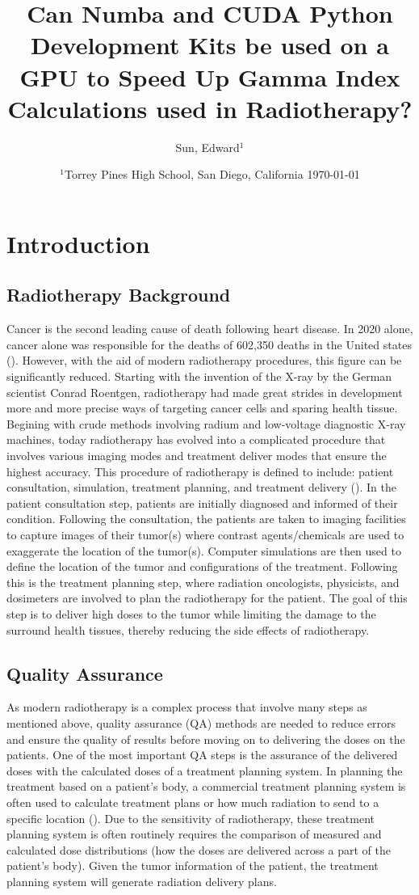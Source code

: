 \documentclass[12pt]{article}
\title{Can Numba and CUDA Python Development Kits be used on a GPU to Speed Up Gamma Index Calculations used in Radiotherapy?}
\author{
  Sun, Edward$^{1}$
}
\date{%
  $^{1}$Torrey Pines High School, San Diego, California
  \today
}
\begin{document}
\maketitle
\section{Introduction}
\subsection{Radiotherapy Background}
Cancer is the second leading cause of death following heart disease. In 2020 alone, cancer alone was responsible for the deaths of 602,350 deaths in the United states (\textcite{CDC}). However, with the aid of modern radiotherapy procedures, this figure can be significantly reduced. Starting with the invention of the X-ray by the German scientist Conrad Roentgen, radiotherapy had made great strides in development more and more precise ways of targeting cancer cells and sparing health tissue. Begining with crude methods involving radium and low-voltage diagnostic X-ray machines, today radiotherapy has evolved into a complicated procedure that involves various imaging modes and treatment deliver modes that ensure the highest accuracy. This procedure of radiotherapy is defined to include: patient consultation, simulation, treatment planning, and treatment delivery (\textcite{SBU}). In the patient consultation step, patients are initially diagnosed and informed of their condition. Following the consultation, the patients are taken to imaging facilities to capture images of their tumor(s) where contrast agents/chemicals are used to exaggerate the location of the tumor(s). Computer simulations are then used to define the location of the tumor and configurations of the treatment. Following this is the treatment planning step, where radiation oncologists, physicists, and dosimeters are involved to plan the radiotherapy for the patient. The goal of this step is to deliver high doses to the tumor while limiting the damage to the surround health tissues, thereby reducing the side effects of radiotherapy.

\subsection{Quality Assurance}
As modern radiotherapy is a complex process that involve many steps as mentioned above, quality assurance (QA) methods are needed to reduce errors and ensure the quality of results before moving on to delivering the doses on the patients. One of the most important QA steps is the assurance of the delivered doses with the calculated doses of a treatment planning system. In planning the treatment based on a patient's body, a commercial treatment planning system is often used to calculate treatment plans or how much radiation to send to a specific location (\textcite{Gardner}). Due to the sensitivity of radiotherapy, these treatment planning system is often routinely requires the comparison of measured and calculated dose distributions (how the doses are delivered across a part of the patient's body). Given the tumor information of the patient, the treatment planning system will generate radiation delivery plans.
\end{document}
